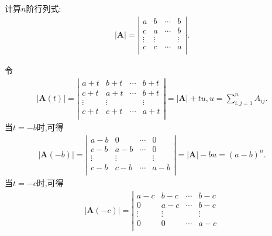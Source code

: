 \documentclass[lang=cn,newtx,10pt,scheme=chinese]{elegantbook}
\begin{document}
\begin{exercise}
    计算$n$阶行列式:
    \begin{align*}
        |\boldsymbol{A}|=\left| \begin{matrix}
            a&		b&		\cdots&		b\\
            c&		a&		\cdots&		b\\
            \vdots&		\vdots&		&		\vdots\\
            c&		c&		\cdots&		a\\
        \end{matrix} \right|.
        \nonumber
    \end{align*}
\end{exercise}
\begin{solution}
    {\color{blue}}
    令
    \begin{align*}
        |\boldsymbol{A}(t)|=\left| \begin{matrix}
            a+t&		b+t&		\cdots&		b+t\\
            c+t&		a+t&		\cdots&		b+t\\
            \vdots&		\vdots&		&		\vdots\\
            c+t&		c+t&		\cdots&		a+t\\
        \end{matrix} \right|=|\boldsymbol{A}|+tu,  u=\sum_{i,j=1}^n{A_{ij}.}
        \nonumber
    \end{align*}
    当$t=-b$时,可得
    \begin{align*}
        |\boldsymbol{A}(-b)|=\left| \begin{matrix}
            a-b&		0&		\cdots&		0\\
            c-b&		a-b&		\cdots&		0\\
            \vdots&		\vdots&		&		\vdots\\
            c-b&		c-b&		\cdots&		a-b\\
        \end{matrix} \right|=|\boldsymbol{A}|-bu=(a-b)^n.
    \end{align*}
    当$t=-c$时,可得
    \begin{align*}
        |\boldsymbol{A}(-c)|=\left| \begin{matrix}
            a-c&		b-c&		\cdots&		b-c\\
            0&		a-c&		\cdots&		b-c\\
            \vdots&		\vdots&		&		\vdots\\
            0&		0&		\cdots&		a-c\\

\end{matrix}
\end{align*}
\end{solution}
\end{document}
